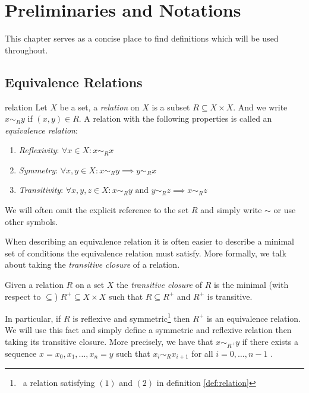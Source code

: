 \chapter{Preliminaries and Notations}
\label{chapter__preliminaries}

This chapter serves as a concise place to find definitions which will be used throughout.
\section{Equivalence Relations}

\begin{definition}{}{relation}
    Let $X$ be a set, a \emph{relation} on $X$ is a subset $R \subseteq X \times X$. And we write $x \sim_R y$ if $(x,y) \in R$.
    A relation with the following properties is called an \emph{equivalence relation}:
    \begin{enumerate}
        \item \emph{Reflexivity}: $\forall x \in X: x \sim_R x$
        \item \emph{Symmetry}: $\forall x,y \in X: x \sim_R y \implies y \sim_R x$
        \item \emph{Transitivity}: $\forall x,y,z \in X: x \sim_R y \text{ and } y \sim_R z \implies x \sim_R z$
    \end{enumerate}
    We will often omit the explicit reference to the set $R$ and simply write $\sim$ or use other symbols.
\end{definition}

When describing an equivalence relation it is often easier to describe a minimal set of conditions the equivalence relation must satisfy. More formally, we talk about taking the \emph{transitive closure} of a relation.

\begin{definition}{}{}
    Given a relation $R$ on a set $X$ the \emph{transitive closure} of $R$ is the minimal (with respect to $\subseteq$) $R^+ \subseteq X \times X$ such that $R \subseteq R^+$ and $R^+$ is transitive.
\end{definition}

In particular, if $R$ is reflexive and symmetric\footnote{\Ie\ a relation satisfying $(1)$ and $(2)$ in definition \ref{def:relation}} then $R^+$ is an equivalence relation.
We will use this fact and simply define a symmetric and reflexive relation then taking its transitive closure.
More precisely, we have that $x \sim_{R^+} y$ if there exists a sequence $x = x_0, x_1, \dots, x_n = y$ such that $x_i \sim_R x_{i+1}$ for all $i = 0, \dots, n-1$ \cite[p.~337]{Lidl1997-kc}.

